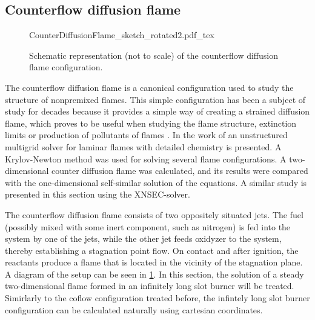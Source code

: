 
\subsection[Counterflow diffusion flame]{Counterflow diffusion flame}\label{ss:CDF}
\begin{figure}[h!]
	\begin{center}
		\def\svgwidth{0.8\textwidth}
		{CounterDiffusionFlame_sketch_rotated2.pdf_tex}
		\caption{Schematic representation (not to scale) of the counterflow diffusion flame configuration.}
		\label{fig:CDFScheme}
	\end{center}
\end{figure}

The counterflow diffusion flame is a canonical configuration used to study the structure of nonpremixed flames. This simple configuration has been a subject of study for decades because it provides a simple way of creating a strained diffusion flame, which proves to be useful when studying the flame structure, extinction limits or production of pollutants of flames \parencite{pandyaStructureFlatCounterFlow1964,spaldingTheoryMixingChemical1961,keyesFlameSheetStarting1987, leeTwodimensionalDirectNumerical2000}. 
In the work of \textcite{paxionDevelopmentParallelUnstructured2001} an unstructured multigrid solver for laminar flames with detailed chemistry is presented. A Krylov-Newton method was used for solving several flame configurations. A two-dimensional counter diffusion flame was calculated, and its results were compared with the one-dimensional self-similar solution of the equations. A similar study is presented in this section using the XNSEC-solver.

The counterflow diffusion flame consists of two oppositely situated jets. The fuel (possibly mixed with some inert component, such as nitrogen) is fed into the system by one of the jets, while the other jet feeds oxidyzer to the system, thereby establishing a stagnation point flow. On contact and after ignition, the reactants produce a flame that is located in the vicinity of the stagnation plane. A diagram of the setup can be seen in \cref{fig:CDFScheme}. In this section, the solution of a steady two-dimensional flame formed in an infinitely long slot burner will be treated. Simirlarly to the coflow configuration treated before, the infintely long slot burner configuration can be calculated naturally using cartesian coordinates.

